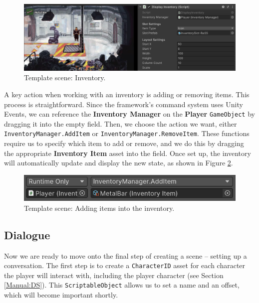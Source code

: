 \begin{figure}[H]
\centering
\includegraphics[width=1\linewidth]{img/User doc/image_2025-07-09_135900005.png}
\caption{Template scene: Inventory.}
\label{fig:Tutorial-template:Inv}
\end{figure}

A key action when working with an inventory is adding or removing items. This process is straightforward. Since the framework's command system uses Unity Events, we can reference the \textbf{Inventory Manager} on the \textbf{Player} \texttt{GameObject} by dragging it into the empty field. Then, we choose the action we want, either \texttt{InventoryManager.AddItem} or \texttt{InventoryManager.RemoveItem}. These functions require us to specify which item to add or remove, and we do this by dragging the appropriate \textbf{Inventory Item} asset into the field. Once set up, the inventory will automatically update and display the new state, as shown in Figure \ref{fig:Tutorial-template:InvAdd}.

\begin{figure}[H]
\centering
\includegraphics[width=0.7\linewidth]{img/User doc/image_2025-07-10_135422445.png}
\caption{Template scene: Adding items into the inventory.}
\label{fig:Tutorial-template:InvAdd}
\end{figure}

\subsection{Dialogue}
\label{Manual:Tutorial:D}
Now we are ready to move onto the final step of creating a scene -- setting up a conversation. The first step is to create a \texttt{CharacterID} asset for each character the player will interact with, including the player character (see Section \ref{Manual:DS}). This \texttt{ScriptableObject} allows us to set a name and an offset, which will become important shortly.

